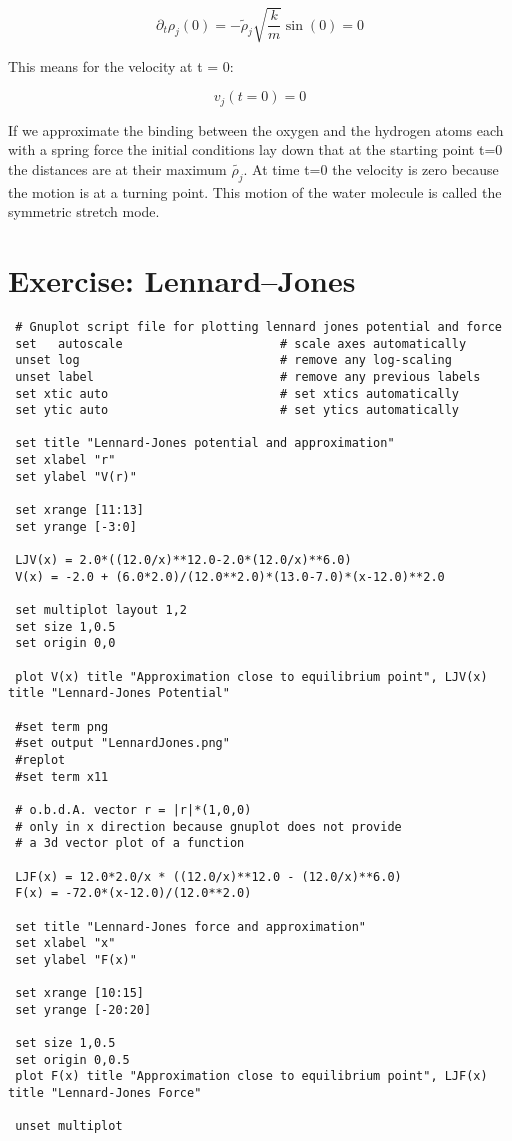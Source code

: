 \documentclass[11pt]{article}
\begin{document}
\[ \partial_t \rho_j(0) = - \tilde{\rho}_j \sqrt{\frac{k}{m}} \sin{\left(0\right)} = 0 \]

This means for the velocity at t = 0: 

\[ v_j(t=0) = 0 \]

If we approximate the binding between the oxygen and the hydrogen atoms each with a spring force the initial conditions lay down that at the starting point t=0 the distances are at their maximum $\tilde{\rho_j}$. At time t=0 the velocity is zero because the motion is at a turning point. This motion of the water molecule is called the symmetric stretch mode.

\section{Exercise: Lennard--Jones}
 \begin{lstlisting}
 # Gnuplot script file for plotting lennard jones potential and force
 set   autoscale                      # scale axes automatically
 unset log                            # remove any log-scaling
 unset label                          # remove any previous labels
 set xtic auto                        # set xtics automatically
 set ytic auto                        # set ytics automatically
 
 set title "Lennard-Jones potential and approximation"
 set xlabel "r"
 set ylabel "V(r)"
 
 set xrange [11:13]
 set yrange [-3:0]
 
 LJV(x) = 2.0*((12.0/x)**12.0-2.0*(12.0/x)**6.0) 
 V(x) = -2.0 + (6.0*2.0)/(12.0**2.0)*(13.0-7.0)*(x-12.0)**2.0
 
 set multiplot layout 1,2 
 set size 1,0.5
 set origin 0,0
 
 plot V(x) title "Approximation close to equilibrium point", LJV(x) title "Lennard-Jones Potential"
 
 #set term png
 #set output "LennardJones.png"
 #replot
 #set term x11
 
 # o.b.d.A. vector r = |r|*(1,0,0)
 # only in x direction because gnuplot does not provide 
 # a 3d vector plot of a function
 
 LJF(x) = 12.0*2.0/x * ((12.0/x)**12.0 - (12.0/x)**6.0)
 F(x) = -72.0*(x-12.0)/(12.0**2.0)
 
 set title "Lennard-Jones force and approximation"
 set xlabel "x"
 set ylabel "F(x)"
 
 set xrange [10:15]
 set yrange [-20:20]
 
 set size 1,0.5
 set origin 0,0.5
 plot F(x) title "Approximation close to equilibrium point", LJF(x) title "Lennard-Jones Force"
 
 unset multiplot
 
 \end{lstlisting}
 
\end{document}
